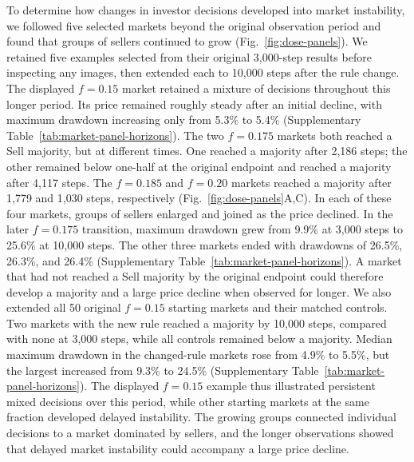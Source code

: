To determine how changes in investor decisions developed into market
instability, we followed five selected markets beyond the original
observation period and found that groups of sellers continued to grow
(Fig.~\ref{fig:dose-panels}). We retained five examples selected from their
original 3,000-step results before inspecting any images, then extended each
to 10,000 steps after the rule change. The displayed $f=0.15$ market retained
a mixture of decisions throughout this longer period. Its price remained
roughly steady after an initial decline, with maximum drawdown increasing
only from 5.3\% to 5.4\% (Supplementary
Table~\ref{tab:market-panel-horizons}). The two $f=0.175$ markets both
reached a Sell majority, but at different times. One reached a majority
after 2,186 steps; the other remained below one-half at the original endpoint
and reached a majority after 4,117 steps. The $f=0.185$ and $f=0.20$ markets
reached a majority after 1,779 and 1,030 steps, respectively
(Fig.~\ref{fig:dose-panels}A,C). In each of these four markets, groups of
sellers enlarged and joined as the price declined. In the later $f=0.175$
transition, maximum drawdown grew from 9.9\% at 3,000 steps to 25.6\% at
10,000 steps. The other three markets ended with drawdowns of 26.5\%,
26.3\%, and 26.4\% (Supplementary Table~\ref{tab:market-panel-horizons}).
A market that had not reached a Sell majority by the original endpoint
could therefore develop a majority and a large price decline when observed
for longer. We also extended all 50 original $f=0.15$ starting markets and
their matched controls. Two markets with the new rule reached a majority
by 10,000 steps, compared with none at 3,000 steps, while all controls
remained below a majority. Median maximum drawdown in the changed-rule
markets rose from 4.9\% to 5.5\%, but the largest increased from 9.3\% to
24.5\% (Supplementary Table~\ref{tab:market-panel-horizons}). The displayed
$f=0.15$ example thus illustrated persistent mixed decisions over this
period, while other starting markets at the same fraction developed delayed
instability. The growing groups connected individual decisions to a market
dominated by sellers, and the longer observations showed that delayed
market instability could accompany a large price decline.

